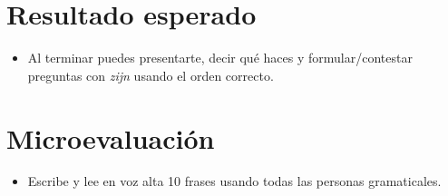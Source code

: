 \section{Resultado esperado}
\begin{itemize}[leftmargin=*]
	\item Al terminar puedes presentarte, decir qué haces y formular/contestar preguntas con \textit{zijn} usando el orden correcto.
\end{itemize}

\section{Microevaluación}
\begin{itemize}[leftmargin=*]
	\item Escribe y lee en voz alta 10 frases usando todas las personas gramaticales.
\end{itemize}
